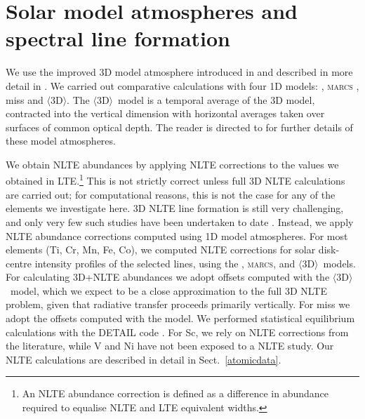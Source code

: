 \documentclass[traditabstract]{aa}
\newcommand{\oneDAV}{$\langle\mathrm{3D}\rangle$}
\begin{document}
\section{Solar model atmospheres and spectral line formation}
\label{model}

We use the improved 3D model atmosphere introduced in  and described in more detail in .  We carried out comparative calculations with four 1D models: , \textsc{marcs} \citep{MARCS75, MARCS97, OSMARCS}, {\sc miss} \citep{MISS} and \oneDAV.  The \oneDAV\ model is a temporal average of the 3D model, contracted into the vertical dimension with horizontal averages taken over surfaces of common optical depth.  The reader is directed to  for further details of these model atmospheres.

We obtain NLTE abundances by applying NLTE corrections to the values we obtained in LTE.\footnote{An NLTE abundance correction is defined as a difference in abundance required to equalise NLTE and LTE equivalent widths.} This is not strictly correct unless full 3D NLTE calculations are carried out; for computational reasons, this is not the case for any of the elements we investigate here. 3D NLTE line formation is still very challenging, and only very few such studies have been undertaken to date \citep[e.g.][]{AspIV, 2009A&A...508.1403P, 2013A&A...554A..96L}. Instead, we apply NLTE abundance corrections computed using 1D model atmospheres. For most elements (Ti, Cr, Mn, Fe, Co), we computed NLTE corrections for solar disk-centre intensity profiles of the selected lines, using the , \textsc{marcs}, and \oneDAV\ models. For calculating 3D+NLTE abundances we adopt offsets computed with the \oneDAV\ model, which we expect to be a close approximation to the full 3D NLTE problem, given that radiative transfer proceeds primarily vertically. For {\sc miss} we adopt the offsets computed with the  model. We performed statistical equilibrium calculations with the DETAIL code \citep{Giddings81,Butler85}. For Sc, we rely on NLTE corrections from the literature, while V and Ni have not been exposed to a NLTE study. Our NLTE calculations are described in detail in Sect.~\ref{atomicdata}. 
\end{document}
